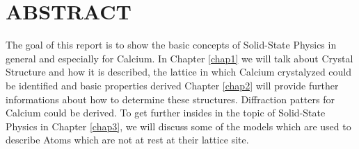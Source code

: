 \section*{ABSTRACT}
The goal of this report is to show the basic concepts of Solid-State Physics in general and especially for Calcium. In Chapter \ref{chap1} we will talk about Crystal Structure and how it is described, the lattice in which Calcium crystalyzed could be identified and basic properties derived
Chapter \ref{chap2} will provide further informations about how to determine these structures. Diffraction patters for Calcium could be derived.
To get further insides in the topic of Solid-State Physics in Chapter \ref{chap3}, we will discuss some of the models which are used to describe Atoms which are not at rest at their lattice site.

